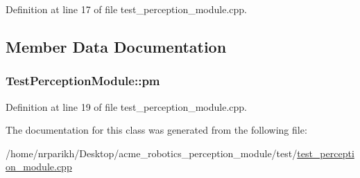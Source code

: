 Definition at line 17 of file test\+\_\+perception\+\_\+module.\+cpp.



\subsection{Member Data Documentation}
\subsubsection[{\texorpdfstring{pm}{pm}}]{ Test\+Perception\+Module\+::pm\hspace{0.3cm}{\ttfamily [protected]}}\hypertarget{class_test_perception_module_a71860459e03b86cd747f283436bcd757}{}\label{class_test_perception_module_a71860459e03b86cd747f283436bcd757}


Definition at line 19 of file test\+\_\+perception\+\_\+module.\+cpp.



The documentation for this class was generated from the following file\+:\begin{DoxyCompactItemize}
\item 
/home/nrparikh/\+Desktop/acme\+\_\+robotics\+\_\+perception\+\_\+module/test/\hyperlink{test__perception__module_8cpp}{test\+\_\+perception\+\_\+module.\+cpp}\end{DoxyCompactItemize}

